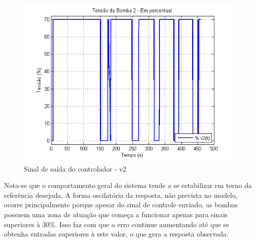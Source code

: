 \begin{figure}[H]
	\centering
	\includegraphics[height=0.35\paperheight, keepaspectratio]{img/ctrl_realv2.png}
	\caption{Sinal de saída do controlador - v2 }
	\label{imgV2Real}
\end{figure}


Nota-se que o comportamento geral do sistema tende a se estabilizar em torno da referência desejada. A forma oscilatória da resposta, não prevista no modelo, ocorre principalmente porque apesar do sinal de controle enviado, as bombas possuem uma zona de atuação que começa a funcionar apenas para sinais superiores à 30\%. Isso faz com que o erro continue aumentando até que se obtenha entradas superiores à este valor, o que gera a resposta observada.

%

